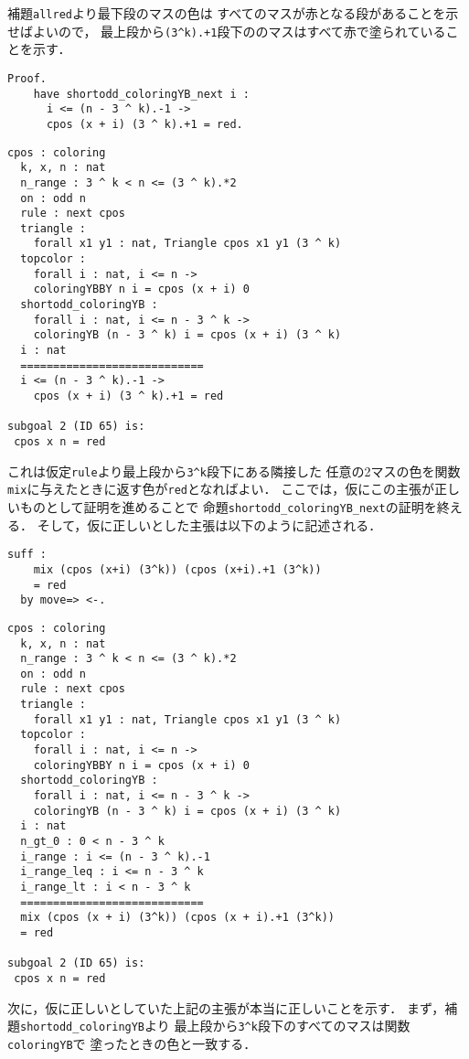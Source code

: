 補題{\tt{allred}}より最下段のマスの色は
すべてのマスが赤となる段があることを示せばよいので，
最上段から{\tt{(3\verb|^|k).+1}}段下ののマスはすべて赤で塗られていることを示す．
\begin{lstlisting}[language=Coq]
  Proof.
    have shortodd_coloringYB_next i :
      i <= (n - 3 ^ k).-1 ->
      cpos (x + i) (3 ^ k).+1 = red.
\end{lstlisting}
\begin{lstlisting}[language=Coq]
  cpos : coloring
  k, x, n : nat
  n_range : 3 ^ k < n <= (3 ^ k).*2
  on : odd n
  rule : next cpos
  triangle :
    forall x1 y1 : nat, Triangle cpos x1 y1 (3 ^ k)
  topcolor :
    forall i : nat, i <= n ->
    coloringYBBY n i = cpos (x + i) 0
  shortodd_coloringYB :
    forall i : nat, i <= n - 3 ^ k ->
    coloringYB (n - 3 ^ k) i = cpos (x + i) (3 ^ k)
  i : nat
  ============================
  i <= (n - 3 ^ k).-1 ->
    cpos (x + i) (3 ^ k).+1 = red

subgoal 2 (ID 65) is:
 cpos x n = red
\end{lstlisting}
これは仮定{\tt{rule}}より最上段から{\tt{3\verb|^|k}}段下にある隣接した
任意の2マスの色を関数{\tt{mix}}に与えたときに返す色が{\tt{red}}となればよい．
ここでは，仮にこの主張が正しいものとして証明を進めることで
命題{\tt{shortodd\_coloringYB\_next}}の証明を終える．
そして，仮に正しいとした主張は以下のように記述される．
\begin{lstlisting}[language=Coq]
  suff :
    mix (cpos (x+i) (3^k)) (cpos (x+i).+1 (3^k))
    = red
  by move=> <-.
\end{lstlisting}
\begin{lstlisting}[language=Coq]
  cpos : coloring
  k, x, n : nat
  n_range : 3 ^ k < n <= (3 ^ k).*2
  on : odd n
  rule : next cpos
  triangle :
    forall x1 y1 : nat, Triangle cpos x1 y1 (3 ^ k)
  topcolor :
    forall i : nat, i <= n ->
    coloringYBBY n i = cpos (x + i) 0
  shortodd_coloringYB :
    forall i : nat, i <= n - 3 ^ k ->
    coloringYB (n - 3 ^ k) i = cpos (x + i) (3 ^ k)
  i : nat
  n_gt_0 : 0 < n - 3 ^ k
  i_range : i <= (n - 3 ^ k).-1
  i_range_leq : i <= n - 3 ^ k
  i_range_lt : i < n - 3 ^ k
  ============================
  mix (cpos (x + i) (3^k)) (cpos (x + i).+1 (3^k))
  = red
  
subgoal 2 (ID 65) is:
 cpos x n = red
\end{lstlisting}
次に，仮に正しいとしていた上記の主張が本当に正しいことを示す．
まず，補題{\tt{shortodd\_coloringYB}}より
最上段から{\tt{3\verb|^|k}}段下のすべてのマスは関数{\tt{coloringYB}}で
塗ったときの色と一致する．
